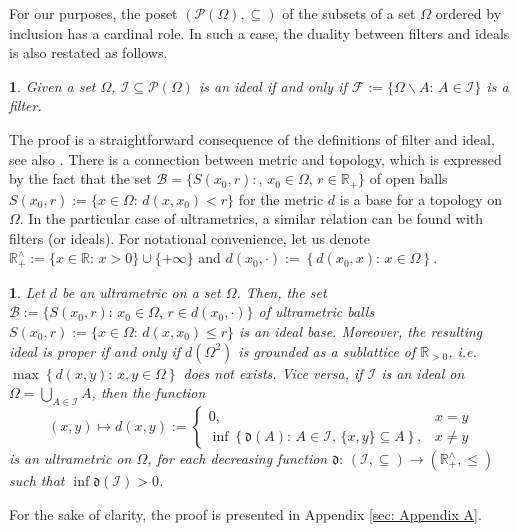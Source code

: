 \documentclass[11pt,british,reqno]{article}
\makeatletter
\numberwithin{equation}{section}
\numberwithin{figure}{section}
\numberwithin{table}{section}
\theoremstyle{definition}
\theoremstyle{definition}
\theoremstyle{plain}
\newtheorem{lemma}{\protect\lemmaname}
\theoremstyle{plain}
\newtheorem{proposition}{\protect\propositionname}
\theoremstyle{remark}
\theoremstyle{plain}
\numberwithin{equation}{section}
\numberwithin{figure}{section}
\numberwithin{table}{section}
\theoremstyle{plain}
\renewenvironment{proof}[1][\proofname]{\par
  \pushQED{\qed}%
  \normalfont \topsep6\p@\@plus6\p@\relax
  \list{}{%
    \settowidth{\leftmargin}{\itshape\proofname:\hskip\labelsep}%
    \setlength{\labelwidth}{0pt}%
    \setlength{\itemindent}{-\leftmargin}%
  }%
  \item[\hskip\labelsep\itshape#1\@addpunct{:}]\ignorespaces
}{%
  \popQED\endlist\@endpefalse
}
\providecommand{\lemmaname}{Lemma}
\providecommand{\propositionname}{Proposition}
\makeatother
\begin{document}
For our purposes, the poset $(\mathcal{P}(\Omega),\subseteq)$ of the 
subsets of a set $\Omega$ ordered by inclusion has a cardinal
role. In such a case, the duality between filters and ideals is also
restated as follows. 
\begin{lemma}
\label{lem: ideals/filters power set case} Given a set $\Omega$,
$\mathcal{I}\subseteq\mathcal{P}(\Omega)$ is an ideal if and only
if $\mathcal{F}:=\{\Omega\backslash A:\,A\in\mathcal{I}\}$ is a filter. 
\end{lemma}
\begin{proof} The proof is a straightforward consequence of the definitions of filter and ideal, see also  \cite{HrbacekJech1999}. 
\end{proof}
There is a connection between metric and topology, which is expressed
by the fact that the set $\mathcal{B}=\{S(x_{0},r):,\,x_{0}\in\Omega,\,r\in\mathbb{R}_{+}\}$ of open balls $S(x_{0},r):=\{x\in\Omega:\,d(x,x_{0})<r\}$ for the
metric $d$ is a base for a topology on $\Omega$. In the particular
case of ultrametrics, a similar relation can be found with filters
(or ideals). For notational convenience, let us denote  $\mathbb{R}_{+}^{\wedge}:=\{x\in\mathbb{R}:\,x>0\}\cup\{+\infty\}$ and $d(x_{0},\cdot):=\left\{ d(x_{0},x):\,x\in\Omega\right\}$. 
\begin{proposition}
\label{prop: filters and ultrametrics} Let $d$ be an
ultrametric on a set $\Omega$. Then, the set $\mathcal{B}:=\{S(x_{0},r):\,x_{0}\in\Omega,\,r\in d(x_{0},\cdot)\}$ of ultrametric balls $S(x_{0},r):=\{x\in\Omega:\,d(x,x_{0})\leq r\}$ is an ideal base. Moreover, the resulting ideal is proper if and only if $d(\Omega^{2})$ is grounded as a sublattice of $\mathbb{R}_{>0}$,
i.e. $\max\left\{ d(x,y):\,x,y\in\Omega\right\} $ does not exists.
Vice versa, if $\mathcal{I}$ is an ideal on ${\displaystyle \Omega=\bigcup_{A\in\mathcal{I}}A}$,
then the function 
\begin{equation}
(x,y)\mapsto d(x,y):=\left\{ \begin{array}{cc}
0, & x=y\\
\inf\left\{ \mathfrak{d}(A):\,A\in\mathcal{I},\,\{x,y\}\subseteq A\right\} , & x\neq y
\end{array}\right.\label{eq: ideal to ultrametric}
\end{equation}
is an ultrametric on $\Omega$, for each decreasing function $\mathfrak{d}:\,(\mathcal{I},\subseteq)\longrightarrow(\mathbb{R}_{+}^{\wedge},\leq)$
such that $\inf\mathfrak{d}(\mathcal{I})>0$. 
\end{proposition}
\begin{proof} For the sake of clarity, the proof is presented in Appendix \ref{sec: Appendix A}.  \end{proof}
\end{document}
